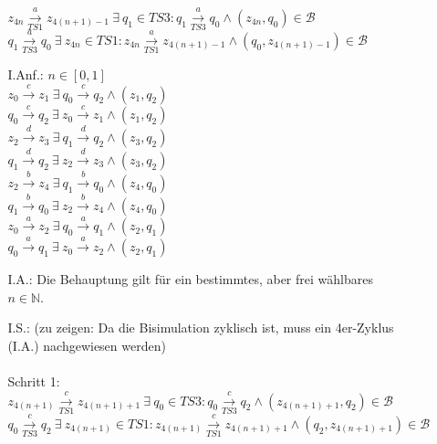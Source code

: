 \documentclass[a4paper,11pt,fleqn]{scrartcl}
\begin{document}
\begin{enumerate}
\begin{enumerate}
\begin{enumerate}
					\(z_{4n}\overset{a}{\underset{TS1}{\rightarrow}}z_{4(n+1)-1}\ \exists\ q_1 \in 
					TS3:q_1\overset{a}{\underset{TS3}{\rightarrow}}q_0 \land (z_{4n},q_0)\in \mathcal{B}\) \\
					
					\(q_1\overset{a}{\underset{TS3}{\rightarrow}}q_0\ \exists\ z_{4n} \in 
					TS1:z_{4n}\overset{a}{\underset{TS1}{\rightarrow}}z_{4(n+1)-1} \land (q_0,z_{4(n+1)-1})\in
					\mathcal{B}\) \\
					
				\item[I.Anf.:]\quad \(n\in [0,1]\) \\
					\(z_0\overset{c}{\rightarrow}z_1\ \exists\ q_0\overset{c}{\rightarrow}q_2\land(z_1,q_2)\) \\
					\(q_0\overset{c}{\rightarrow}q_2\ \exists\ z_0\overset{c}{\rightarrow}z_1\land(z_1,q_2)\) \\
					\(z_2\overset{d}{\rightarrow}z_3\ \exists\ q_1\overset{d}{\rightarrow}q_2\land(z_3,q_2)\) \\
					\(q_1\overset{d}{\rightarrow}q_2\ \exists\ z_2\overset{d}{\rightarrow}z_3\land(z_3,q_2)\)
\\
					\(z_2\overset{b}{\rightarrow}z_4\ \exists\ q_1\overset{b}{\rightarrow}q_0\land(z_4,q_0)\)
\\
					\(q_1\overset{b}{\rightarrow}q_0\ \exists\ z_2\overset{b}{\rightarrow}z_4\land(z_4,q_0)\)
\\
					\(z_0\overset{a}{\rightarrow}z_2\ \exists\ q_0\overset{a}{\rightarrow}q_1\land(z_2,q_1)\)
\\
					\(q_0\overset{a}{\rightarrow}q_1\ \exists\ z_0\overset{a}{\rightarrow}z_2\land(z_2,q_1)\)
\\
				\item[I.A.:]
					Die Behauptung gilt für ein bestimmtes, aber frei wählbares \(n\in \mathbb{N}\).
				\newpage
				\item[I.S.:] (zu zeigen: Da die Bisimulation zyklisch ist, muss ein 4er-Zyklus (I.A.)
				nachgewiesen werden) \\ \\
					Schritt 1:
					\(z_{4(n+1)}\overset{c}{\underset{TS1}{\rightarrow}}z_{4(n+1)+1}\ \exists\ q_0 \in 
					TS3:q_0\overset{c}{\underset{TS3}{\rightarrow}}q_2 \land (z_{4(n+1)+1},q_2)\in
					\mathcal{B}\) \\
					
					\(q_0\overset{c}{\underset{TS3}{\rightarrow}}q_2\ \exists\ z_{4(n+1)} \in 
					TS1:z_{4(n+1)}\overset{c}{\underset{TS1}{\rightarrow}}z_{4(n+1)+1} \land
					(q_2,z_{4(n+1)+1})\in
					\mathcal{B}\) \\
					

\end{enumerate}
\end{enumerate}
\end{enumerate}
\end{document}
